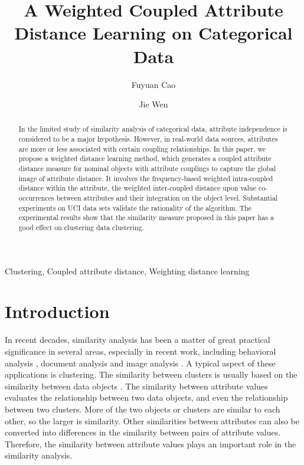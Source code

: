 \documentclass[review]{elsarticle}
\begin{document}
\begin{frontmatter}
\title{A Weighted Coupled Attribute Distance Learning on Categorical Data}

\author[a]{Fuyuan Cao}

\author[a]{Jie Wen}


\address[a]{Key Laboratory of Computational
Intelligence and Chinese Information Processing of Ministry of
Education, School of Computer and Information Technology, Shanxi
University, Taiyuan 030006, China}

\begin{abstract}
In the limited study of similarity analysis of categorical data, attribute independence is considered to be a major hypothesis. However, in real-world data sources, attributes are more or less associated with certain coupling relationships. In this paper, we propose a weighted distance learning method, which generates a coupled attribute distance measure for nominal objects with attribute couplings to capture the global image of attribute distance. It involves the frequency-based weighted intra-coupled distance within the attribute, the weighted inter-coupled distance upon value co-occurrences between attributes and their integration on the object level. Substantial experiments on UCI data sets validate the rationality of the algorithm. The experimental results show that the similarity measure proposed in this paper has a good effect on clustering data clustering.
\end{abstract}
\begin{keyword}
Clustering, Coupled attribute distance, Weighting distance learning
\end{keyword}

\end{frontmatter}

\section{Introduction}
In recent decades, similarity analysis has been a matter of great practical significance in several areas, especially in recent work, including behavioral analysis \cite{CaoL2012Behavior}, document analysis \cite{FigheiredoF2011Word} and image analysis \cite{WangG2012Image}. A typical aspect of these applications is clustering. The similarity between clusters is usually based on the similarity between data objects \cite{WangC2015CADO}. The similarity between attribute values evaluates the relationship between two data objects, and even the relationship between two clusters. More of the two objects or clusters are similar to each other, so the larger is similarity. Other similarities between attributes can also be converted into differences in the similarity between pairs of attribute values. Therefore, the similarity between attribute values plays an important role in the similarity analysis.
\end{document}
